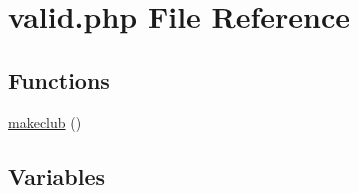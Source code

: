 \hypertarget{valid_8php}{\section{valid.\+php File Reference}
\label{valid_8php}
}
\subsection*{Functions}
\begin{DoxyCompactItemize}
\item 
\hyperlink{valid_8php_adbb0878423a92349917e0f6d54446759}{makeclub} ()
\end{DoxyCompactItemize}
\subsection*{Variables}
